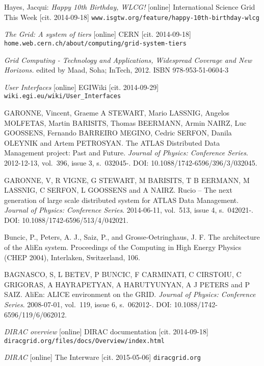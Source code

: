 
\def\bibname{Bibliography}
\begin{thebibliography}{99}
\addcontentsline{toc}{chapter}{\bibname}


	Hayes, Jacqui: 
	\emph{Happy 10th Birthday, WLCG!} [online]
	International Science Grid This Week [cit. 2014-09-18]
	\texttt{www.isgtw.org/feature/happy-10th-birthday-wlcg}

	\emph{The Grid: A system of tiers} [online] 
	CERN [cit. 2014-09-18]
	\texttt{home.web.cern.ch/about/computing/grid-system-tiers}

	\emph{Grid Computing - Technology and Applications, Widespread Coverage and New Horizons.} 
	edited by Maad, Soha; InTech, 2012.
	ISBN 978-953-51-0604-3

	\emph{User Interfaces} [online] 
	EGIWiki [cit. 2014-09-29]
	\texttt{wiki.egi.eu/wiki/User\_Interfaces}
	
	GARONNE, Vincent, Graeme A STEWART, Mario LASSNIG, Angelos MOLFETAS, Martin BARISITS, Thomas BEERMANN, 
	Armin NAIRZ, Luc GOOSSENS, Fernando BARREIRO MEGINO, Cedric SERFON, Danila OLEYNIK and Artem PETROSYAN. 
	The ATLAS Distributed Data Management project: Past and Future. 
	\textit{Journal of Physics: Conference Series}. 2012-12-13, vol.~396, issue 3, s.~032045-. 
	DOI: 10.1088/1742-6596/396/3/032045. 
	
	GARONNE, V, R VIGNE, G STEWART, M BARISITS, T B EERMANN, M LASSNIG, C SERFON, L GOOSSENS and A NAIRZ. 
	Rucio – The next generation of large scale distributed system for ATLAS Data Management. 
	\textit{Journal of Physics: Conference Series}. 2014-06-11, vol.~513, issue 4, s.~042021-. 
	DOI: 10.1088/1742-6596/513/4/042021.
	
	Buncic, P., Peters, A. J., Saiz, P., and Grosse-Oetringhaus, J. F.  
	The architecture of the AliEn system. Proceedings of the Computing in High Energy Physics (CHEP 2004), 				
	Interlaken, Switzerland, 106.
	
	BAGNASCO, S, L BETEV, P BUNCIC, F CARMINATI, C CIRSTOIU, C GRIGORAS, A HAYRAPETYAN, A HARUTYUNYAN, 
	A J PETERS and P SAIZ. AliEn: 
	ALICE environment on the GRID. 
	\textit{Journal of Physics: Conference Series}. 2008-07-01, vol.~119, issue 6, s.~062012-. 
	DOI: 10.1088/1742-6596/119/6/062012.

	\emph{DIRAC overview} [online] 
	DIRAC documentation [cit. 2014-09-18]
	\texttt{diracgrid.org/files/docs/Overview/index.html}
	
	\emph{DIRAC} [online] 
	The Interware [cit. 2015-05-06]
	\texttt{diracgrid.org}
		

\end{thebibliography}
